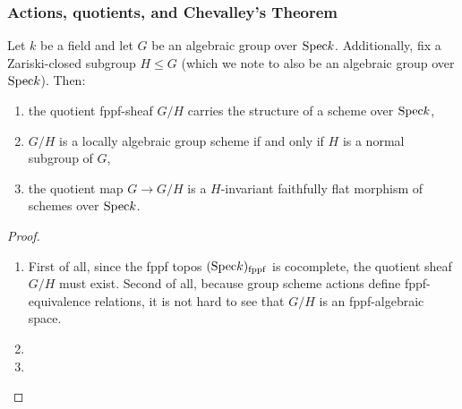             \subsubsection{Actions, quotients, and Chevalley's Theorem}
                \begin{proposition} \label{prop: quotients_by_algebraic_groups}
                    Let $k$ be a field and let $G$ be an algebraic group over $\mathrm{Spec} k$. Additionally, fix a Zariski-closed subgroup $H \leq G$ (which we note to also be an algebraic group over $\mathrm{Spec} k$). Then:
                        \begin{enumerate}
                            \item the quotient fppf-sheaf $G/H$ carries the structure of a scheme over $\mathrm{Spec} k$,
                            \item $G/H$ is a locally algebraic group scheme if and only if $H$ is a normal subgroup of $G$,
                            \item the quotient map $G \to G/H$ is a $H$-invariant faithfully flat morphism of schemes over $\mathrm{Spec} k$.
                        \end{enumerate}
                \end{proposition}
                    \begin{proof}
                        \noindent
                        \begin{enumerate}
                            \item First of all, since the fppf topos $(\mathrm{Spec} k)_{\mathrm{fppf}}$ is cocomplete, the quotient sheaf $G/H$ must exist. Second of all, because group scheme actions define fppf-equivalence relations, it is not hard to see that $G/H$ is an fppf-algebraic space. 
                            \item 
                            \item 
                        \end{enumerate}
                    \end{proof}
                

